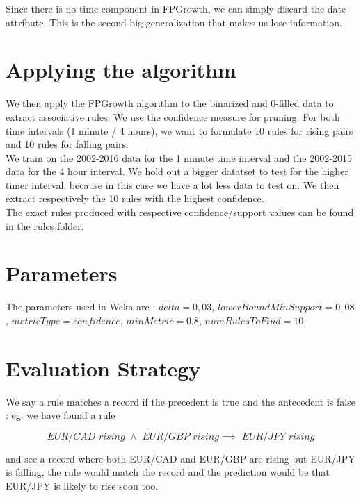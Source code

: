 \documentclass[paper=a4,fontsize=11pt,DIV=8,BCOR=5mm,twoside,pdftex]{scrartcl}
\begin{document}
	Since there is no time component in FPGrowth, we can simply discard the date attribute. This is the second big generalization that makes us lose information.\\
		
	\section{Applying the algorithm}
	
	We then apply the FPGrowth algorithm to the binarized and 0-filled data to extract associative rules. We use the confidence measure for pruning. For both time intervals (1 minute / 4 hours), we want to formulate  10 rules for  rising pairs and 10 rules for falling pairs.\\
	
	We train on the 2002-2016 data for the 1 minute time interval and the 2002-2015 data for the 4 hour interval. We hold out a bigger datatset to test for the higher timer interval, because in this case we have a lot less data to test on. We then extract respectively the 10 rules with the highest confidence.\\
	
	The exact rules produced with respective confidence/support values can be found in the rules folder.
	
	\section{Parameters}
	
	The parameters used in Weka are : $delta = 0,03$, $lowerBoundMinSupport = 0,08$, $metricType = confidence$, $minMetric = 0.8$, $numRulesToFind = 10$.
	
	\section{Evaluation Strategy}
	
	We say a rule matches a record if the precedent is true and the antecedent is false : eg. we have found a rule 
	
	\begin{equation}\nonumber
		\textit{EUR/CAD rising }\land\textit{ EUR/GBP rising} \implies \textit{ EUR/JPY rising}
	\end{equation}
	
	and see a record where both EUR/CAD and EUR/GBP are rising but EUR/JPY is falling, the rule would match the record and the prediction would be that EUR/JPY is likely to rise soon too.\\
	
\end{document}
